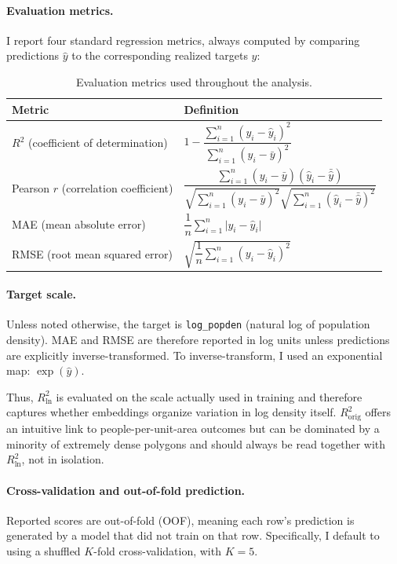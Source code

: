 \documentclass[12pt,letterpaper]{article}
\begin{document}
\paragraph{Evaluation metrics.} I report four standard regression metrics, always computed by comparing predictions $\hat{y}$ to the corresponding realized targets $y$:
\begin{table}[H]
  \centering
  \caption{Evaluation metrics used throughout the analysis.}
  \label{tab:eval_metrics_code}
  \renewcommand{\arraystretch}{2.2}
  \setlength{\tabcolsep}{10pt}
  \begin{tabular}{@{}ll@{}}
    \toprule
    \textbf{Metric} & \textbf{Definition} \\
    \midrule
    $R^2$ (coefficient of determination) &
    $1 - \dfrac{\sum_{i=1}^{n} (y_i - \hat{y}_i)^2}{\sum_{i=1}^{n} (y_i - \bar{y})^2}$ \\
    Pearson $r$ (correlation coefficient) & 
    $\dfrac{\sum_{i=1}^{n} (y_i - \bar{y})(\hat{y}_i - \bar{\hat{y}})}{\sqrt{\sum_{i=1}^{n} (y_i - \bar{y})^2} \sqrt{\sum_{i=1}^{n} (\hat{y}_i - \bar{\hat{y}})^2}}$ \\
    MAE (mean absolute error) &
    $\dfrac{1}{n}\sum_{i=1}^{n} \lvert y_i - \hat{y}_i \rvert$ \\
    RMSE (root mean squared error) &
    $\sqrt{\dfrac{1}{n}\sum_{i=1}^{n} (y_i - \hat{y}_i)^2}$ \\
    \bottomrule
  \end{tabular}
\end{table}

\paragraph{Target scale.} Unless noted otherwise, the target is \texttt{log\_popden} (natural log of population density). MAE and RMSE are therefore reported in log units unless predictions are explicitly inverse-transformed. To inverse-transform, I used an exponential map: $\exp(\hat{y})$.

Thus, $R^2_{\ln}$ is evaluated on the scale actually used in training and therefore captures whether embeddings organize variation in log density itself. $R^2_{\mathrm{orig}}$ offers an intuitive link to people-per-unit-area outcomes but can be dominated by a minority of extremely dense polygons and should always be read together with $R^2_{\ln}$, not in isolation.

\paragraph{Cross-validation and out-of-fold prediction.} Reported scores are out-of-fold (OOF), meaning each row's prediction is generated by a model that did not train on that row. Specifically, I default to using a shuffled $K$-fold cross-validation, with $K=5$.
\end{document}
